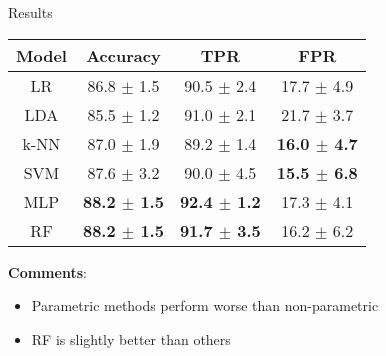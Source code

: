 \begin{frame}{Results}
\begin{table}[ht]
\small
\begin{center}
\begin{tabular}{c c c c }
\toprule
  Model     & Accuracy & TPR & FPR \\
\midrule
LR   &  86.8 $\pm$ 1.5 & 90.5  $\pm$  2.4 &  17.7  $\pm$  4.9 \\
LDA   &  85.5  $\pm$  1.2  & 91.0  $\pm$  2.1 &  21.7  $\pm$  3.7 \\
k-NN  &    87.0  $\pm$  1.9 & 89.2  $\pm$  1.4  & \textbf{16.0  $\pm$  4.7} \\
SVM  &   87.6  $\pm$  3.2 & 90.0  $\pm$  4.5 & \textbf{15.5  $\pm$  6.8} \\
MLP  &\textbf{88.2  $\pm$  1.5} & \textbf{92.4  $\pm$  1.2} & 17.3  $\pm$  4.1 \\
RF  & \textbf{88.2  $\pm$  1.5} & \textbf{91.7 $\pm$ 3.5} & 16.2  $\pm$  6.2 \\
\bottomrule
\end{tabular}
\end{center}
\end{table}

\begin{minipage}[t]{0.7\linewidth}
\textbf{Comments}:
    \begin{itemize}
        \item Parametric methods perform worse than non-parametric
        \item RF is slightly better than others
    \end{itemize}
\end{minipage}

\end{frame}
